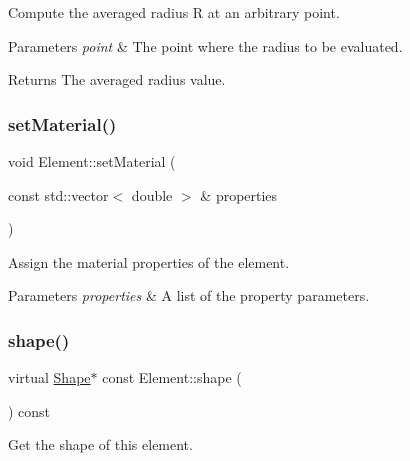 Compute the averaged radius R at an arbitrary point. 


\begin{DoxyParams}{Parameters}
{\em point} & The point where the radius to be evaluated. \\
\hline
\end{DoxyParams}
\begin{DoxyReturn}{Returns}
The averaged radius value. 
\end{DoxyReturn}
\mbox{\label{class_element_a8e923aa55ff84470e93b788cf3b1f30d}} 
\subsubsection{\texorpdfstring{set\+Material()}{setMaterial()}}
{\footnotesize\ttfamily void Element\+::set\+Material (\begin{DoxyParamCaption}\item[{const std\+::vector$<$ double $>$ \&}]{properties }\end{DoxyParamCaption})}



Assign the material properties of the element. 


\begin{DoxyParams}{Parameters}
{\em properties} & A list of the property parameters. \\
\hline
\end{DoxyParams}
\mbox{\label{class_element_aadc36f89fa5f11da7e74d6528ecdcacc}} 
\subsubsection{\texorpdfstring{shape()}{shape()}}
{\footnotesize\ttfamily virtual \mbox{\hyperlink{class_shape}{Shape}}$\ast$ const Element\+::shape (\begin{DoxyParamCaption}{ }\end{DoxyParamCaption}) const\hspace{0.3cm}{\ttfamily [pure virtual]}}



Get the shape of this element. 

